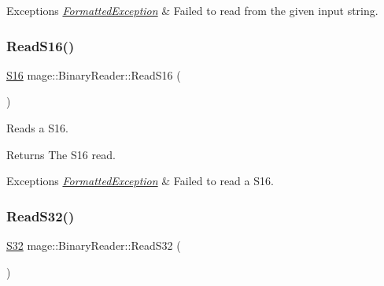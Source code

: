 \begin{DoxyExceptions}{Exceptions}
{\em \hyperlink{classmage_1_1_formatted_exception}{Formatted\+Exception}} & Failed to read from the given input string. \\
\hline
\end{DoxyExceptions}
\hypertarget{classmage_1_1_binary_reader_af3a7befd21ef51de83d702811c50a0b1}{}\label{classmage_1_1_binary_reader_af3a7befd21ef51de83d702811c50a0b1} 
\subsubsection{\texorpdfstring{Read\+S16()}{ReadS16()}}
{\footnotesize\ttfamily \hyperlink{namespacemage_add9d3fe59b2a338108e98fcd67507005}{S16} mage\+::\+Binary\+Reader\+::\+Read\+S16 (\begin{DoxyParamCaption}{ }\end{DoxyParamCaption})\hspace{0.3cm}{\ttfamily [protected]}}

Reads a {\ttfamily S16}.

\begin{DoxyReturn}{Returns}
The {\ttfamily S16} read. 
\end{DoxyReturn}

\begin{DoxyExceptions}{Exceptions}
{\em \hyperlink{classmage_1_1_formatted_exception}{Formatted\+Exception}} & Failed to read a {\ttfamily S16}. \\
\hline
\end{DoxyExceptions}
\hypertarget{classmage_1_1_binary_reader_a4711e731be78dbc45f223919c3ac4ff4}{}\label{classmage_1_1_binary_reader_a4711e731be78dbc45f223919c3ac4ff4} 
\subsubsection{\texorpdfstring{Read\+S32()}{ReadS32()}}
{\footnotesize\ttfamily \hyperlink{namespacemage_a642e05c5c83642b6946703615cdbf2da}{S32} mage\+::\+Binary\+Reader\+::\+Read\+S32 (\begin{DoxyParamCaption}{ }\end{DoxyParamCaption})\hspace{0.3cm}{\ttfamily [protected]}}

